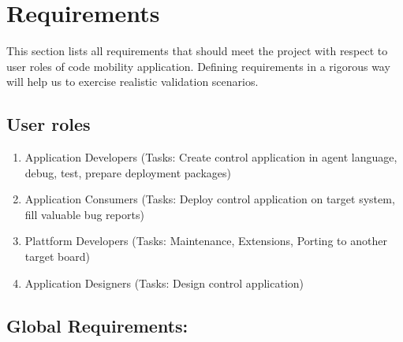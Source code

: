 \documentclass{scrreprt}
\begin{document}
\chapter{Requirements}

This section lists all requirements that should meet the project with respect to 
user roles of code mobility application.
Defining requirements in a rigorous way will help us to exercise realistic validation scenarios.


\renewcommand{\labelenumi}{R_\arabic{enumi}}
\renewcommand{\labelenumii}{R_\arabic{enumi}_\arabic{enumii}}


\section{User roles}
\renewcommand{\labelenumi}{R_UR_\arabic{enumi}}
\begin{enumerate}

\item Application Developers (Tasks: Create control application in agent language, debug, test, prepare deployment packages)

\item Application Consumers  (Tasks: Deploy control application on target system, fill valuable bug reports)

\item Plattform Developers (Tasks: Maintenance, Extensions, Porting to another target board)

\item Application Designers (Tasks: Design control application)
\end{enumerate}


\section{Global Requirements: }
\end{document}
